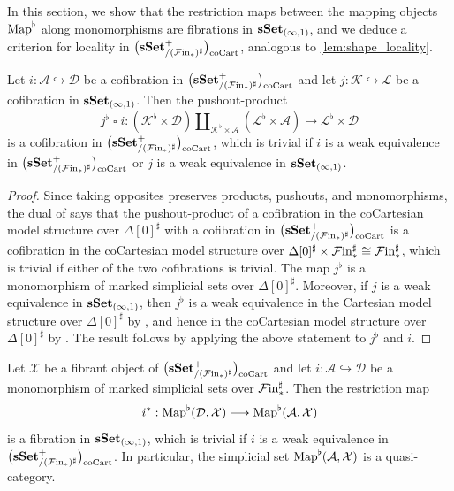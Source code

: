 \documentclass[10pt,reqno]{amsart}
\begin{document}
In this section, we show that the restriction maps between the mapping
objects $\operatorname{Map}^\flat$ along monomorphisms are fibrations in
$\mathbf{sSet}_{(\infty,1)}$, and we deduce a criterion for locality in
$\bigl(\mathbf{sSet}^+_{/(\mathcal{F}\mathrm{in}_*)^\sharp}\bigr)_{\mathrm{coCart}}$, analogous to \cref{lem:shape_locality}.

\begin{lemma}
\label{lem:cocartesian_joyal_pushout_product}
Let $i:\mathcal A\hookrightarrow\mathcal D$ be a cofibration
in $\bigl(\mathbf{sSet}^+_{/(\mathcal{F}\mathrm{in}_*)^\sharp}\bigr)_{\mathrm{coCart}}$ and let
$j:\mathcal K\hookrightarrow\mathcal L$ be a cofibration
in $\mathbf{sSet}_{(\infty,1)}$. Then the pushout-product
\[
j^\flat\mathbin{\square}i:
(\mathcal K^\flat\times\mathcal D)
\amalg_{\mathcal K^\flat\times\mathcal A}
(\mathcal L^\flat\times\mathcal A)
\longrightarrow\mathcal L^\flat\times\mathcal D
\]
is a cofibration in $\bigl(\mathbf{sSet}^+_{/(\mathcal{F}\mathrm{in}_*)^\sharp}\bigr)_{\mathrm{coCart}}$, which is trivial if $i$ is a weak
equivalence in $\bigl(\mathbf{sSet}^+_{/(\mathcal{F}\mathrm{in}_*)^\sharp}\bigr)_{\mathrm{coCart}}$ or $j$ is a weak equivalence in
$\mathbf{sSet}_{(\infty,1)}$.
\end{lemma}

\begin{proof}
Since taking opposites preserves products, pushouts, and
monomorphisms, the dual of
\cite[Corollary~3.1.4.3]{lurie2009higher} says that the
pushout-product of a cofibration in the coCartesian model structure
over $\Delta[0]^\sharp$ with a cofibration in $\bigl(\mathbf{sSet}^+_{/(\mathcal{F}\mathrm{in}_*)^\sharp}\bigr)_{\mathrm{coCart}}$ is a
cofibration in the coCartesian model structure over
$\Delta[0]^\sharp\times\mathcal{F}\mathrm{in}_*^\sharp\cong\mathcal{F}\mathrm{in}_*^\sharp$, which is
trivial if either of the two cofibrations is trivial. The map
$j^\flat$ is a monomorphism of marked simplicial sets over
$\Delta[0]^\sharp$. Moreover, if $j$ is a weak equivalence in
$\mathbf{sSet}_{(\infty,1)}$, then $j^\flat$ is a weak equivalence in the
Cartesian model structure over $\Delta[0]^\sharp$ by
\cite[Proposition~3.1.5.3]{lurie2009higher}, and hence in the
coCartesian model structure over $\Delta[0]^\sharp$ by
\cite[Remark~3.1.4.6]{lurie2009higher}. The result follows by applying
the above statement to $j^\flat$ and $i$.
\end{proof}

\begin{proposition}
\label{prop:marked_mapping_fibration}
Let $\mathcal X$ be a fibrant object of $\bigl(\mathbf{sSet}^+_{/(\mathcal{F}\mathrm{in}_*)^\sharp}\bigr)_{\mathrm{coCart}}$ and let
$i:\mathcal A\hookrightarrow\mathcal D$ be a monomorphism of marked
simplicial sets over $\mathcal{F}\mathrm{in}_*^\sharp$. Then the restriction map
\[
i^*:\operatorname{Map}^\flat(\mathcal D,\mathcal X)
\longrightarrow\operatorname{Map}^\flat(\mathcal A,\mathcal X)
\]
is a fibration in $\mathbf{sSet}_{(\infty,1)}$, which is trivial if $i$ is
a weak equivalence in $\bigl(\mathbf{sSet}^+_{/(\mathcal{F}\mathrm{in}_*)^\sharp}\bigr)_{\mathrm{coCart}}$. In particular, the simplicial set
$\operatorname{Map}^\flat(\mathcal A,\mathcal X)$ is a quasi-category.
\end{proposition}
\end{document}
